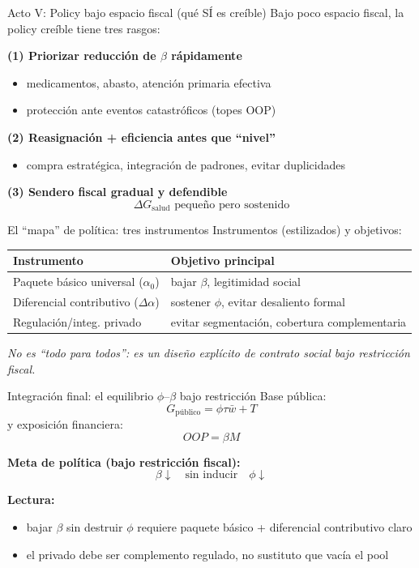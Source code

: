 \documentclass[10pt]{beamer}
\begin{document}
\begin{frame}{Acto V: Policy bajo espacio fiscal (qué SÍ es creíble)}
Bajo poco espacio fiscal, la policy creíble tiene tres rasgos:

\bigskip
\textbf{(1) Priorizar reducción de \(\beta\) rápidamente}
\begin{itemize}
  \item medicamentos, abasto, atención primaria efectiva
  \item protección ante eventos catastróficos (topes OOP)
\end{itemize}

\bigskip
\textbf{(2) Reasignación + eficiencia antes que “nivel”}
\begin{itemize}
  \item compra estratégica, integración de padrones, evitar duplicidades
\end{itemize}

\bigskip
\textbf{(3) Sendero fiscal gradual y defendible}
\[
\Delta G_{\text{salud}} \text{ pequeño pero sostenido}
\]
\end{frame}

\begin{frame}{El “mapa” de política: tres instrumentos}
Instrumentos (estilizados) y objetivos:

\bigskip
\begin{tabular}{p{} p{}}
\textbf{Instrumento} & \textbf{Objetivo principal} \\
\hline
Paquete básico universal (\(\alpha_0\)) & bajar \(\beta\), legitimidad social \\
Diferencial contributivo (\(\Delta\alpha\)) & sostener \(\phi\), evitar desaliento formal \\
Regulación/integ. privado & evitar segmentación, cobertura complementaria \\
\end{tabular}

\bigskip
\emph{No es “todo para todos”: es un diseño explícito de contrato social bajo restricción fiscal.}
\end{frame}

\begin{frame}{Integración final: el equilibrio \(\phi\)--\(\beta\) bajo restricción}
Base pública:
\[
G_{\text{público}} = \phi\tau \bar w + T
\]
y exposición financiera:
\[
OOP=\beta M
\]

\bigskip
\textbf{Meta de política (bajo restricción fiscal):}
\[
\beta \downarrow \quad \text{sin inducir} \quad \phi \downarrow
\]

\bigskip
\textbf{Lectura:}
\begin{itemize}
  \item bajar \(\beta\) sin destruir \(\phi\) requiere paquete básico + diferencial contributivo claro
  \item el privado debe ser complemento regulado, no sustituto que vacía el pool
\end{itemize}
\end{frame}
\end{document}
